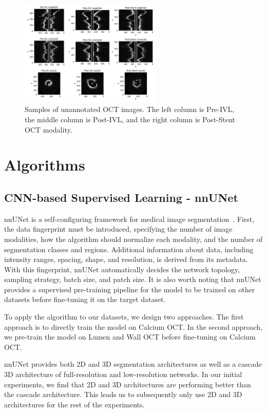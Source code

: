 \documentclass[a4paper,11pt,oneside]{report}
\begin{document}
\begin{figure}[htb]
    \centering
    \includegraphics[width=0.6\textwidth]{figures/fig_datasets_unlabeled_oct_sample.pdf}
    \caption{Samples of unannotated OCT images. The left column is Pre-IVL, the middle column is Post-IVL, and the right column is Post-Stent OCT modality.}
    \label{fig:unannotated-oct}
\end{figure}

\newpage
\section{Algorithms}
\subsection{CNN-based Supervised Learning - nnUNet}\label{sec:design:nnunet}
nnUNet is a self-configuring framework for medical image segmentation~\cite{Isensee2020}. First, the data fingerprint must be introduced, specifying the number of image modalities, how the algorithm should normalize each modality, and the number of segmentation classes and regions. Additional information about data, including intensity ranges, spacing, shape, and resolution, is derived from its metadata. With this fingerprint, nnUNet automatically decides the network topology, sampling strategy, batch size, and patch size. It is also worth noting that nnUNet provides a supervised pre-training pipeline for the model to be trained on other datasets before fine-tuning it on the target dataset.

To apply the algorithm to our datasets, we design two approaches. The first approach is to directly train the model on Calcium OCT. In the second approach, we pre-train the model on Lumen and Wall OCT before fine-tuning on Calcium OCT. 

nnUNet provides both 2D and 3D segmentation architectures as well as a cascade 3D architecture of full-resolution and low-resolution networks. In our initial experiments, we find that 2D and 3D architectures are performing better than the cascade architecture. This leads us to subsequently only use 2D and 3D architectures for the rest of the experiments.
\end{document}
